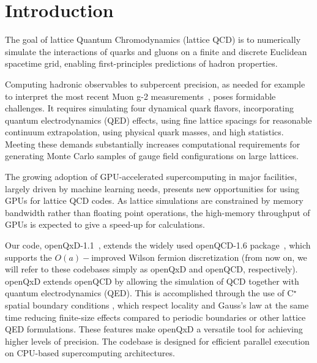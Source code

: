 \chapter{Introduction}
\label{ch:p1:introduction}

The goal of lattice Quantum Chromodynamics (lattice QCD) is to numerically simulate the interactions of quarks and gluons on a finite and discrete Euclidean spacetime grid, enabling first-principles predictions of hadron properties. 

Computing hadronic observables to subpercent precision, as needed for example to interpret the most recent Muon g-2 measurements~\cite{Muong-2:2023cdq,Gerardin:2020gpp}, poses formidable challenges. It requires simulating four dynamical quark flavors, incorporating quantum electrodynamics (QED) effects, using fine lattice spacings for reasonable continuum extrapolation, using physical quark masses, and high statistics. Meeting these demands substantially increases computational requirements for generating Monte Carlo samples of gauge field configurations on large lattices.

The growing adoption of GPU-accelerated supercomputing in major facilities, largely driven by machine learning needs, presents new opportunities for using GPUs for lattice QCD codes. As lattice simulations are constrained by memory bandwidth rather than floating point operations, the high-memory throughput of GPUs is expected to give a speed-up for calculations.

Our code, openQxD-1.1~\cite{openqxd}, extends the widely used openQCD-1.6 package~\cite{online:openqcd}, which supports the $O(a)-$improved Wilson fermion discretization (from now on, we will refer to these codebases simply as openQxD and openQCD, respectively). openQxD extends openQCD by allowing the simulation of QCD together with quantum electrodynamics (QED). This is accomplished through the use of C$^\star$ spatial boundary conditions \cite{Kronfeld1991}, which respect locality and Gauss's law at the same time reducing finite-size effects compared to periodic boundaries or other lattice QED formulations. These features make openQxD a versatile tool for achieving higher levels of precision. The codebase is designed for efficient parallel execution on CPU-based supercomputing architectures.

